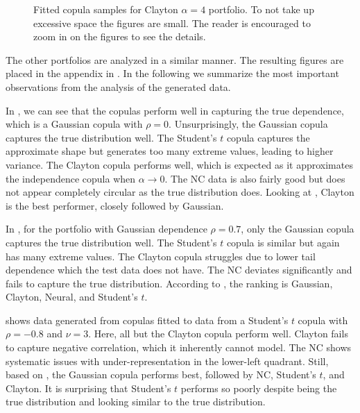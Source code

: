 \begin{figure}
\begin{minipage}{0.49\textwidth}
    \end{minipage}
    \caption{Fitted copula samples for Clayton $\alpha=4$ portfolio. To not take up excessive space the figures are small. The reader is encouraged to zoom in on the figures to see the details.}
    \label{fig:GeneratedDataClayton}
\end{figure}

The other portfolios are analyzed in a similar manner. The resulting figures are placed in the appendix in . In the following we summarize the most important observations from the analysis of the generated data.

In , we can see that the copulas perform well in capturing the true dependence, which is a Gaussian copula with $\rho = 0$. Unsurprisingly, the Gaussian copula captures the true distribution well. The Student's $t$ copula captures the approximate shape but generates too many extreme values, leading to higher variance. The Clayton copula performs well, which is expected as it approximates the independence copula when $\alpha \rightarrow 0$. The \gls{NC} data is also fairly good but does not appear completely circular as the true distribution does. Looking at , Clayton is the best performer, closely followed by Gaussian.

In , for the portfolio with Gaussian dependence $\rho = 0.7$, only the Gaussian copula captures the true distribution well. The Student's $t$ copula is similar but again has many extreme values. The Clayton copula struggles due to lower tail dependence which the test data does not have. The \gls{NC} deviates significantly and fails to capture the true distribution. According to , the ranking is Gaussian, Clayton, Neural, and Student's $t$.

 shows data generated from copulas fitted to data from a Student's $t$ copula with $\rho = -0.8$ and $\nu = 3$. Here, all but the Clayton copula perform well. Clayton fails to capture negative correlation, which it inherently cannot model. The \gls{NC} shows systematic issues with under-representation in the lower-left quadrant. Still, based on , the Gaussian copula performs best, followed by \gls{NC}, Student's $t$, and Clayton. It is surprising that Student's $t$ performs so poorly despite being the true distribution and looking similar to the true distribution.

